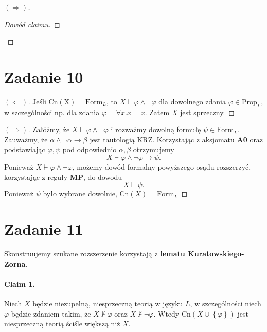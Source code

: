 \begin{proof}[\( (\Rightarrow) \)]
\begin{proof}[Dowód claimu]
\end{proof}

\end{proof}

\section*{Zadanie 10}

\begin{proof}[\((\Leftarrow)\)]
    Jeśli \( \mathrm{Cn(X)} = \mathrm{Form}_L \), to \( X \vdash \varphi \wedge \neg\varphi \) dla dowolnego zdania \( \varphi \in \mathrm{Prop}_L \), w szczególności np. dla zdania \( \varphi = \forall x. x = x \). Zatem \( X \) jest sprzeczny.
\end{proof}

\begin{proof}[\( (\Rightarrow) \)]
Załóżmy, że \( X \vdash \varphi \wedge \neg \varphi \) i rozważmy dowolną formułę \( \psi \in \mathrm{Form}_L \).
Zauważmy, że \( \alpha \wedge \neg \alpha \to \beta \) jest tautologią KRZ. Korzystając z aksjomatu \textbf{A0} oraz podstawiając \( \varphi, \psi \) pod odpowiednio \( \alpha, \beta \) otrzymujemy
\[ 
    X \vdash \varphi \wedge \neg \varphi \to \psi.
\]
Ponieważ \( X \vdash \varphi \wedge \neg \varphi \), możemy dowód formalny powyższego osądu rozszerzyć, korzystając z reguły \textbf{MP}, do dowodu
\[ 
    X \vdash \psi. 
\]
Ponieważ \( \psi \) było wybrane dowolnie, \( \mathrm{Cn}(X) = \mathrm{Form}_L \)
\end{proof}

\section*{Zadanie 11}

Skonstruujemy szukane rozszerzenie korzystają z \textbf{lematu Kuratowskiego-Zorna}. 

\paragraph{Claim 1.} Niech \( X \) będzie niezupełną, niesprzeczną teorią w języku \( L \), w szczególności niech \( \varphi \) będzie zdaniem takim, że \( X \not\vdash \varphi \) oraz \( X \not\vdash \neg\varphi \). Wtedy \( \mathrm{Cn}(X \cup \left\{ \varphi \right\}) \) jest niesprzeczną teorią ściśle większą niż \( X \).

